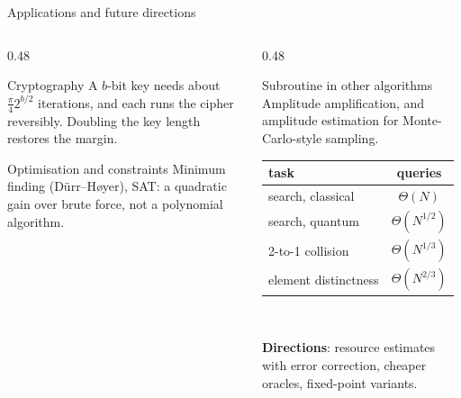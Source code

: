 \documentclass[aspectratio=169,11pt]{beamer}
\newcommand{\key}[1]{{\color{qdark}\textbf{#1}}}
\begin{document}
\begin{frame}{Applications and future directions}
  \begin{columns}[T]
    \begin{column}{0.48\textwidth}
      \begin{block}{Cryptography}
        A $b$-bit key needs about $\frac\pi42^{b/2}$ iterations, and each runs the cipher reversibly. Doubling the key length restores the margin.
      \end{block}
      \begin{block}{Optimisation and constraints}
        Minimum finding (D{\"u}rr--H{\o}yer), SAT: a quadratic gain over brute force, not a polynomial algorithm.
      \end{block}
    \end{column}
    \begin{column}{0.48\textwidth}
      \begin{block}{Subroutine in other algorithms}
        Amplitude amplification, and amplitude estimation for Monte-Carlo-style sampling.
      \end{block}
      \centering\small
      \begin{tabular}{lc}
        \toprule
        task & queries\\
        \midrule
        search, classical & $\Theta(N)$\\
        search, quantum & $\Theta(N^{1/2})$\\
        2-to-1 collision & $\Theta(N^{1/3})$\\
        element distinctness & $\Theta(N^{2/3})$\\
        \bottomrule
      \end{tabular}\\[1mm]
      \raggedright\small \key{Directions}: resource estimates with error correction, cheaper oracles, fixed-point variants.
    \end{column}
  \end{columns}
\end{frame}
\end{document}
